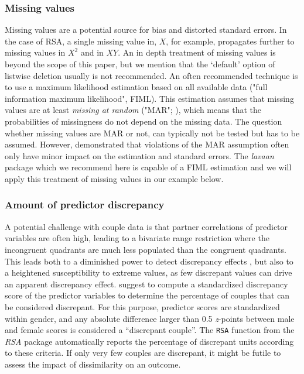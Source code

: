 \documentclass[jou,a4paper,draftfirst]{apa6}
\begin{document}
\subsubsection{Missing values}
Missing values are a potential source for bias and distorted standard errors. In the case of RSA, a single missing value in, $X$, for example, propagates further to missing values in $X^2$ and in $XY$. An in depth treatment of missing values is beyond the scope of this paper, but we mention that the `default' option of listwise deletion usually is not recommended. An often recommended technique is to use a maximum likelihood estimation based on all available data ("full information maximum likelihood", FIML). This estimation assumes that missing values are at least \emph{missing at random} ("MAR"; ), which means that the probabilities of missingness do not depend on the missing data. The question whether missing values are MAR or not, can typically not be tested but has to be assumed. However, \textcite{collins_comparison_2001} demonstrated that violations of the MAR assumption often only have minor impact on the estimation and standard errors. The \emph{lavaan} package which we recommend here is capable of a FIML estimation and we will apply this treatment of missing values in our example below.


\subsubsection{Amount of predictor discrepancy}
A potential challenge with couple data is that partner correlations of predictor variables are often high, leading to a bivariate range restriction where the incongruent quadrants are much less populated than the congruent quadrants. This leads both to a diminished power to detect discrepancy effects \parencite{McClelland_Judd_1993}, but also to a heightened susceptibility to extreme values, as few discrepant values can drive an apparent discrepancy effect. \textcite{shanock_polynomial_2010} suggest to compute a standardized discrepancy score of the predictor variables to determine the percentage of couples that can be considered discrepant. For this purpose, predictor scores are standardized within gender, and any absolute difference larger than 0.5 \textit{z}-points between male and female scores is considered a ``discrepant couple''. The {\tt RSA} function from the \textit{RSA} package automatically reports the percentage of discrepant units according to these criteria. If only very few couples are discrepant, it might be futile to assess the impact of dissimilarity on an outcome. 
\end{document}
